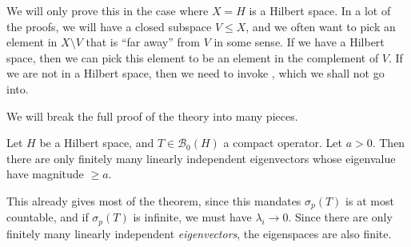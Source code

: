 \documentclass[a4paper]{article}
\begin{document}
We will only prove this in the case where $X = H$ is a Hilbert space. In a lot of the proofs, we will have a closed subspace $V \leq X$, and we often want to pick an element in $X \setminus V$ that is ``far away'' from $V$ in some sense. If we have a Hilbert space, then we can pick this element to be an element in the complement of $V$. If we are not in a Hilbert space, then we need to invoke , which we shall not go into.

We will break the full proof of the theory into many pieces.

\begin{prop}
  Let $H$ be a Hilbert space, and $T \in \mathcal{B}_0(H)$ a compact operator. Let $a > 0$. Then there are only finitely many linearly independent eigenvectors whose eigenvalue have magnitude $\geq a$.
\end{prop}
This already gives most of the theorem, since this mandates $\sigma_p(T)$ is at most countable, and if $\sigma_p(T)$ is infinite, we must have $\lambda_i \to 0$. Since there are only finitely many linearly independent \emph{eigenvectors}, the eigenspaces are also finite.
\end{document}
